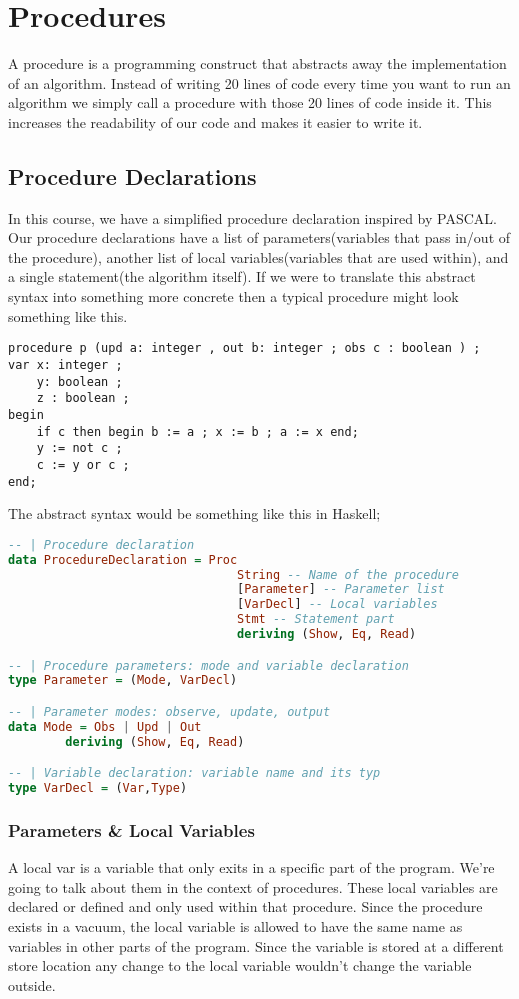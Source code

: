\chapter{Procedures}

A procedure is a programming construct that abstracts away the implementation of an algorithm. Instead of writing 20 lines of code 
every time you want to run an algorithm we simply call a procedure with those 20 lines of code inside it. This increases the readability 
of our code and makes it easier to write it. 
\section{Procedure Declarations}
In this course, we have a simplified procedure declaration inspired by PASCAL. Our procedure declarations have a list of 
parameters(variables that pass in/out of the procedure), another list of local variables(variables that are used within), 
and a single statement(the algorithm itself).
If we were to translate this abstract syntax into something more concrete then a typical procedure might look something like this.
\begin{lstlisting}
procedure p (upd a: integer , out b: integer ; obs c : boolean ) ;
var x: integer ;
    y: boolean ;
    z : boolean ;
begin
    if c then begin b := a ; x := b ; a := x end;
    y := not c ;
    c := y or c ;
end;
\end{lstlisting}
The abstract syntax would be something like this in Haskell;
\begin{lstlisting}[language=Haskell]
-- | Procedure declaration
data ProcedureDeclaration = Proc
                                String -- Name of the procedure
                                [Parameter] -- Parameter list
                                [VarDecl] -- Local variables
                                Stmt -- Statement part
                                deriving (Show, Eq, Read)

-- | Procedure parameters: mode and variable declaration
type Parameter = (Mode, VarDecl)

-- | Parameter modes: observe, update, output
data Mode = Obs | Upd | Out 
        deriving (Show, Eq, Read)

-- | Variable declaration: variable name and its typ
type VarDecl = (Var,Type)

\end{lstlisting}
\subsection{Parameters \& Local Variables}
A \gls{local var} is a variable that only exits in a specific part of the program. We're going to talk about them in the context of procedures.
These local variables are declared or defined and only used within that procedure.
Since the procedure exists in a vacuum, the local variable is allowed to have the same name as variables in other parts of the program. 
Since the variable is stored at a different store location any change to the local variable wouldn't change the variable outside.

